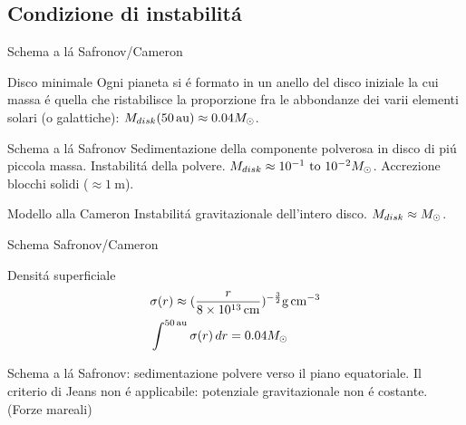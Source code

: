 \subsection{Condizione di instabilit\'a}

\begin{frame}{Schema a l\'a Safronov/Cameron}
\begin{block}{Disco minimale}
Ogni pianeta si \'e formato in un anello del disco iniziale la cui massa \'e quella che ristabilisce la proporzione fra le abbondanze dei varii elementi solari (o galattiche): $M_{disk}(\SI{50}{\astronomicalunit})\approx0.04\msun{}$.
\end{block}
\begin{block}{Schema a l\'a Safronov}
Sedimentazione della componente polverosa in disco di pi\'u piccola massa. Instabilit\'a della polvere. $M_{disk}\approx\numrange{e-1}{e-2}\msun{}$.
Accrezione blocchi solidi ($\approx\SI{1}{\meter}$).
\end{block}
\begin{block}{Modello alla Cameron}
Instabilit\'a gravitazionale dell'intero disco. $M_{disk}\approx M_{\odot}{}$.
\end{block}
\end{frame}

\begin{wordonframe}{Schema Safronov/Cameron}
\begin{block}{Densit\'a superficiale}
\begin{align*}
&\sigma(r)\approx(\frac{r}{\SI{8e13}{cm}})\expy{-\frac{3}{2}}\si{\gram\per\cubic\cm}\\
&\int^{\SI{50}{\astronomicalunit}}\sigma(r)\,dr=0.04\msun{}
\end{align*}
\end{block}
Schema a l\'a Safronov: sedimentazione polvere verso il piano equatoriale.
Il criterio di Jeans non \'e applicabile: potenziale gravitazionale non \'e costante. (Forze mareali)
\end{wordonframe}

